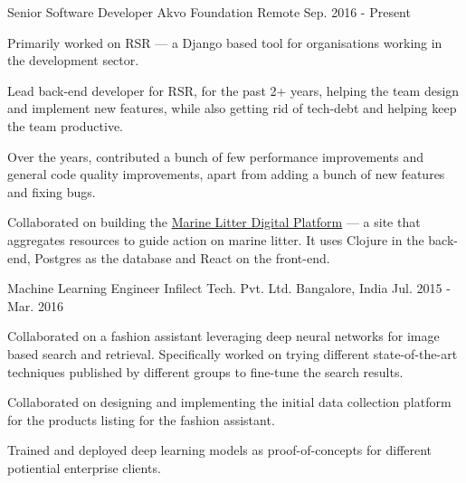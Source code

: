 

\begin{cventries}

  \cventry
      {Senior Software Developer} %
      {Akvo Foundation} %
      {Remote} %
      {Sep. 2016 - Present} %
      {
        \begin{cvitems} %
        \item {Primarily worked on RSR --- a Django based tool for organisations working in the development sector.}
        \item {Lead back-end developer for RSR, for the past 2+ years, helping the team design and implement new features, while also getting rid of tech-debt and helping keep the team productive.}
        \item {Over the years, contributed a bunch of few performance improvements and general code quality improvements, apart from adding a bunch of new features and fixing bugs.}
        \item {Collaborated on building the \href{https://digital.gpmarinelitter.org/}{Marine Litter Digital Platform} --- a site that aggregates resources to guide action on marine litter. It uses Clojure in the back-end, Postgres as the database and React on the front-end.}
        \end{cvitems}
      }

  \cventry
    {Machine Learning Engineer} %
    {Infilect Tech. Pvt. Ltd.} %
    {Bangalore, India} %
    {Jul. 2015 - Mar. 2016} %
    {
      \begin{cvitems} %
      \item{Collaborated on a fashion assistant leveraging deep neural networks for image based search and retrieval. Specifically worked on trying different state-of-the-art techniques published by different groups to fine-tune the search results.}
        \item{Collaborated on designing and implementing the initial data collection platform for the products listing for the fashion assistant.}
        \item{Trained and deployed deep learning models as proof-of-concepts for different potiential enterprise clients.}
      \end{cvitems}
    }


\end{cventries}
